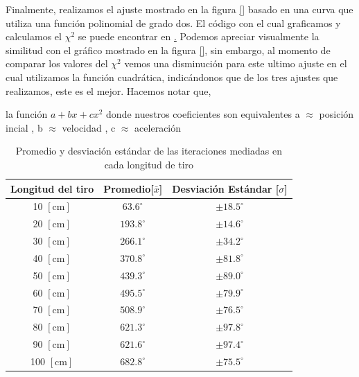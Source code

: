 \documentclass[11pt]{article}
\begin{document}
\medskip

Finalmente, realizamos el ajuste mostrado en la figura \ref{} basado en una curva que utiliza una función polinomial de grado dos. El código con el cual graficamos y calculamos el $\chi^2$ se puede encontrar en \href{}. Podemos apreciar visualmente la similitud con el gráfico mostrado en la figura \ref{}, sin embargo, al momento de comparar los valores del $\chi^2$ vemos una disminución para este ultimo ajuste en el cual utilizamos la función cuadrática, indicándonos que de los tres ajustes que realizamos, este es el mejor. Hacemos notar que, 


la función $a + bx + cx^2$ donde nuestros coeficientes son equivalentes  a  $\approx $ posición incial  , b $\approx$ velocidad , c $\approx$ aceleración 





\begin{table}[ht]
\centering
\begin{tabular}{|c|c|c|}
\hline
\small{Longitud del tiro} & Promedio[$\bar{x}$]  & Desviación Estándar [$\sigma$]\\ \hline
 10  \scriptsize{$[\text{cm}]$} & $63.6^\circ$  & $\pm 18.5^\circ$  \\ \hline
 20  \scriptsize{$[\text{cm}]$} & $193.8^\circ$ & $\pm 14.6^\circ$  \\ \hline
 30  \scriptsize{$[\text{cm}]$} & $266.1^\circ$ & $\pm 34.2^\circ$  \\ \hline
 40  \scriptsize{$[\text{cm}]$} & $370.8^\circ$ & $\pm 81.8^\circ$  \\ \hline
 50  \scriptsize{$[\text{cm}]$} & $439.3^\circ$ & $\pm 89.0^\circ$  \\ \hline
 60  \scriptsize{$[\text{cm}]$} & $495.5^\circ$ & $\pm 79.9^\circ$  \\ \hline
 70  \scriptsize{$[\text{cm}]$} & $508.9^\circ$ & $\pm 76.5^\circ$  \\ \hline
 80  \scriptsize{$[\text{cm}]$} & $621.3^\circ$ & $\pm 97.8^\circ$  \\ \hline
 90  \scriptsize{$[\text{cm}]$} & $621.6^\circ$ & $\pm 97.4^\circ$  \\ \hline
 100 \scriptsize{$[\text{cm}]$} & $682.8^\circ$ & $\pm 75.5^\circ$  \\ \hline 
\end{tabular}
\caption{Promedio y desviación estándar de las iteraciones mediadas en cada longitud de tiro}
\label{tabla}
\end{table}
\end{document}
